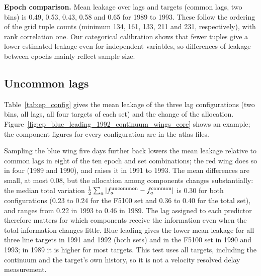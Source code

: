 \textbf{Epoch comparison.} Mean leakage over lags and targets (common lags, two bins)
is 0.49, 0.53, 0.43, 0.58 and 0.65 for 1989 to 1993. These follow the ordering of
the grid tuple counts (minimum 134, 161, 133, 211 and 231, respectively), with rank
correlation one. Our categorical calibration shows that fewer tuples give a lower
estimated leakage even for independent variables, so differences of leakage between
epochs mainly reflect sample size.

\subsection{Uncommon lags}

Table~\ref{tab:ep_config} gives the mean leakage of the three lag configurations
(two bins, all lags, all four targets of each set) and the change of the allocation.
Figure~\ref{fig:ep_blue_leading_1992_continuum_wings_core} shows an example; the component
figures for every configuration are in the atlas files.

\begin{SURDtable}
\centering
\caption{Mean leakage over the 30 lags and four targets for common lags and for the
blue leading and red leading uncommon lags (two bins). The next column is the
mean difference blue leading minus red leading over the three line targets. The last
column counts line targets for which blue leading has the lower mean leakage.}
\label{tab:ep_config}
\small

\end{SURDtable}

Sampling the blue wing five days further back lowers the mean leakage relative to
common lags in eight of the ten epoch and set combinations; the red wing does so in
four (1989 and 1990), and raises it in 1991 to 1993. The mean differences are small,
at most 0.08, but the allocation among components changes substantially: the median
total variation $\frac12\sum_a|f_a^{\rm uncommon}-f_a^{\rm common}|$ is 0.30 for both
configurations (0.23 to 0.24 for the F5100 set and 0.36 to 0.40 for the total set),
and ranges from 0.22 in 1993 to 0.46 in 1989. The lag assigned to each predictor
therefore matters for which components receive the information even when the total
information changes little. Blue leading gives the lower mean leakage for all three line
targets in 1991 and 1992 (both sets) and in the F5100 set in 1990 and 1993; in 1989 it is
higher for most targets. This test uses all targets, including the continuum
and the target's own history, so it is not a velocity resolved delay measurement.


